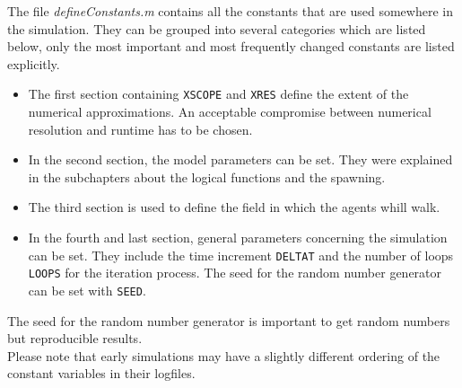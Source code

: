 
\noi The file \textit{defineConstants.m} contains all the constants that are used somewhere in the simulation. They can be grouped into several categories which are listed below, only the most important and most frequently changed constants are listed explicitly.
\begin{itemize}
	\item The first section containing \texttt{XSCOPE} and \texttt{XRES} define the extent of the numerical approximations. An acceptable compromise between numerical resolution and runtime has to be chosen.
	\item In the second section, the model parameters can be set. They were explained in the subchapters about the logical functions and the spawning.
	\item The third section is used to define the field in which the agents whill walk.
	\item In the fourth and last section, general parameters concerning the simulation can be set. They include the time increment \texttt{DELTAT} and the number of loops \texttt{LOOPS} for the iteration process. The seed for the random number generator can be set with \texttt{SEED}.
\end{itemize}
\noi The seed for the random number generator is important to get random numbers but reproducible results.\\
Please note that early simulations may have a slightly different ordering of the constant variables in their logfiles.